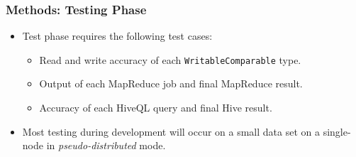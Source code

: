 \documentclass[hyperref={pdfpagelabels=false}]{beamer}
\begin{document}
\begin{frame}
\frametitle{Methods: Testing Phase}

\begin{itemize}

\item Test phase requires the following test cases:
  \begin{itemize}
    \item Read and write accuracy of each {\tt WritableComparable} type.
    \item Output of each MapReduce job and final MapReduce result.
    \item Accuracy of each HiveQL query and final Hive result.
  \end{itemize}

\pause 

\item Most testing during development will occur on a small data set on a
single-node in {\it pseudo-distributed} mode.
\end{itemize}

\end{frame}
\end{document}
